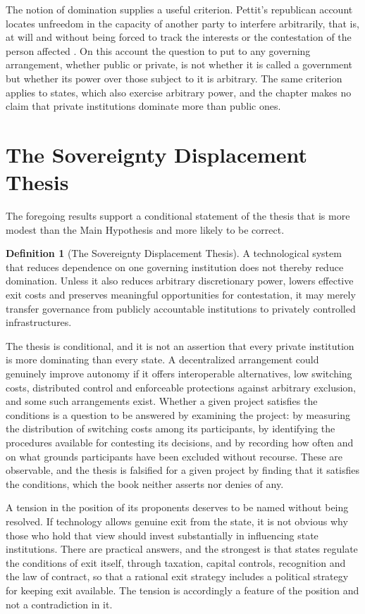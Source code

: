 \documentclass[11pt,twoside,openany]{book}
\theoremstyle{definition}
\newtheorem{definition}[theorem]{Definition}
\theoremstyle{remark}
\begin{document}
The notion of domination supplies a useful criterion. Pettit's republican account locates unfreedom in the capacity of another party to interfere arbitrarily, that is, at will and without being forced to track the interests or the contestation of the person affected \cite{pettit1997}. On this account the question to put to any governing arrangement, whether public or private, is not whether it is called a government but whether its power over those subject to it is arbitrary. The same criterion applies to states, which also exercise arbitrary power, and the chapter makes no claim that private institutions dominate more than public ones.

\section{The Sovereignty Displacement Thesis}

The foregoing results support a conditional statement of the thesis that is more modest than the Main Hypothesis and more likely to be correct.

\begin{definition}[The Sovereignty Displacement Thesis]
A technological system that reduces dependence on one governing institution does not thereby reduce domination. Unless it also reduces arbitrary discretionary power, lowers effective exit costs and preserves meaningful opportunities for contestation, it may merely transfer governance from publicly accountable institutions to privately controlled infrastructures.
\end{definition}

The thesis is conditional, and it is not an assertion that every private institution is more dominating than every state. A decentralized arrangement could genuinely improve autonomy if it offers interoperable alternatives, low switching costs, distributed control and enforceable protections against arbitrary exclusion, and some such arrangements exist. Whether a given project satisfies the conditions is a question to be answered by examining the project: by measuring the distribution of switching costs among its participants, by identifying the procedures available for contesting its decisions, and by recording how often and on what grounds participants have been excluded without recourse. These are observable, and the thesis is falsified for a given project by finding that it satisfies the conditions, which the book neither asserts nor denies of any.

A tension in the position of its proponents deserves to be named without being resolved. If technology allows genuine exit from the state, it is not obvious why those who hold that view should invest substantially in influencing state institutions. There are practical answers, and the strongest is that states regulate the conditions of exit itself, through taxation, capital controls, recognition and the law of contract, so that a rational exit strategy includes a political strategy for keeping exit available. The tension is accordingly a feature of the position and not a contradiction in it.
\end{document}
